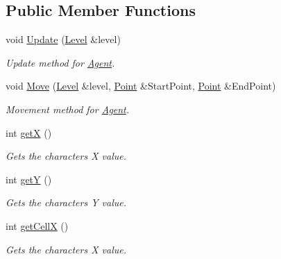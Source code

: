 \subsection*{Public Member Functions}
\begin{DoxyCompactItemize}
\item 
\mbox{\label{class_agent_aa273213a1d5fbd26b473b6ed7c99ddb8}} 
void \hyperlink{class_agent_aa273213a1d5fbd26b473b6ed7c99ddb8}{Update} (\hyperlink{class_level}{Level} \&level)
\begin{DoxyCompactList}\small\item\em Update method for \hyperlink{class_agent}{Agent}. \end{DoxyCompactList}\item 
\mbox{\label{class_agent_ab42895cf783c51c67a8719b7bdab9794}} 
void \hyperlink{class_agent_ab42895cf783c51c67a8719b7bdab9794}{Move} (\hyperlink{class_level}{Level} \&level, \hyperlink{class_point}{Point} \&Start\+Point, \hyperlink{class_point}{Point} \&End\+Point)
\begin{DoxyCompactList}\small\item\em Movement method for \hyperlink{class_agent}{Agent}. \end{DoxyCompactList}\item 
\mbox{\label{class_agent_a207c925e3183a06c4ee6ce06d3d10f25}} 
int \hyperlink{class_agent_a207c925e3183a06c4ee6ce06d3d10f25}{getX} ()
\begin{DoxyCompactList}\small\item\em Gets the characters X value. \end{DoxyCompactList}\item 
\mbox{\label{class_agent_ae354a9492265ed3686565676bbe27bf9}} 
int \hyperlink{class_agent_ae354a9492265ed3686565676bbe27bf9}{getY} ()
\begin{DoxyCompactList}\small\item\em Gets the characters Y value. \end{DoxyCompactList}\item 
\mbox{\label{class_agent_af8ae93713803f18c352981c6c96ed89e}} 
int \hyperlink{class_agent_af8ae93713803f18c352981c6c96ed89e}{get\+CellX} ()
\begin{DoxyCompactList}\small\item\em Gets the characters X value. \end{DoxyCompactList}\item 

\end{DoxyCompactItemize}
